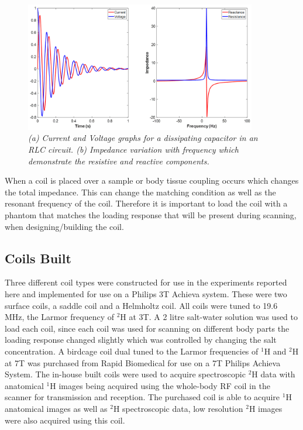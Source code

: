 \begin{figure}
    \centering
    \includegraphics[width=0.9\textwidth]{Figures/Theory/VI.png}
    \caption{\textit{(a) Current and Voltage graphs for a dissipating capacitor in an RLC circuit. (b) Impedance variation with frequency which demonstrate the resistive and reactive components.}}
    \label{fig:theory:VI}
\end{figure}

When a coil is placed over a sample or body tissue coupling occurs which changes the total impedance. This can change the matching condition as well as the resonant frequency of the coil. Therefore it is important to load the coil with a phantom that matches the loading response that will be present during scanning, when designing/building the coil. 

\subsection{Coils Built}

Three different coil types were constructed for use in the experiments reported here and implemented for use on a Philips 3T Achieva system. These were two surface coils, a saddle coil and a Helmholtz coil. All coils were tuned to 19.6 MHz, the Larmor frequency of $^2$H at 3T. A 2 litre salt-water solution was used to load each coil, since each coil was used for scanning on different body parts the loading response changed slightly which was controlled by changing the salt concentration. A birdcage coil dual tuned to the Larmor frequencies of $^1$H and $^2$H at 7T was purchased from Rapid Biomedical for use on a 7T Philips Achieva System. The in-house built coils were used to acquire spectroscopic $^2$H data with anatomical $^1$H images being acquired using the whole-body \ac{RF} coil in the scanner for transmission and reception. The purchased coil is able to acquire $^1$H anatomical images as well as $^2$H spectroscopic data, low resolution $^2$H images were also acquired using this coil.

